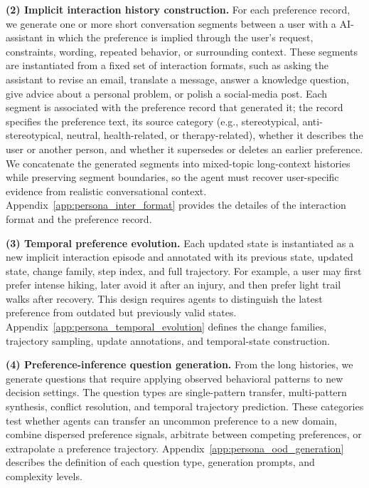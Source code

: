 \documentclass{article}
\begin{document}
\textbf{(2) Implicit interaction history construction.}
For each preference record, we generate one or more short conversation segments between a user with a AI-assistant in which the preference is implied through the user's request, constraints, wording, repeated behavior, or surrounding context. These segments are instantiated from a fixed set of interaction formats, such as asking the assistant to revise an email, translate a message, answer a knowledge question, give advice about a personal problem, or polish a social-media post. 
Each segment is associated with the preference record that generated it; the record specifies the preference text, its source category (e.g., stereotypical, anti-stereotypical, neutral, health-related, or therapy-related), whether it describes the user or another person, and whether it supersedes or deletes an earlier preference. 
We concatenate the generated segments into mixed-topic long-context histories while preserving segment boundaries, so the agent must recover user-specific evidence from realistic conversational context.
Appendix~\ref{app:persona_inter_format} provides the detailes of the interaction format and the preference record.



\textbf{(3) Temporal preference evolution.}
Each updated state is instantiated as a new implicit interaction episode and annotated with its previous state, updated state, change family, step index, and full trajectory. For example, a user may first prefer intense hiking, later avoid it after an injury, and then prefer light trail walks after recovery. This design requires agents to distinguish the latest preference from outdated but previously valid states. Appendix~\ref{app:persona_temporal_evolution} defines the change families, trajectory sampling, update annotations, and temporal-state construction.

\textbf{(4) Preference-inference question generation.}
From the long histories, we generate questions that require applying observed behavioral patterns to new decision settings. The question types are single-pattern transfer, multi-pattern synthesis, conflict resolution, and temporal trajectory prediction. These categories test whether agents can transfer an uncommon preference to a new domain, combine dispersed preference signals, arbitrate between competing preferences, or extrapolate a preference trajectory. Appendix~\ref{app:persona_ood_generation} describes the definition of each question type, generation prompts, and complexity levels.
\end{document}

